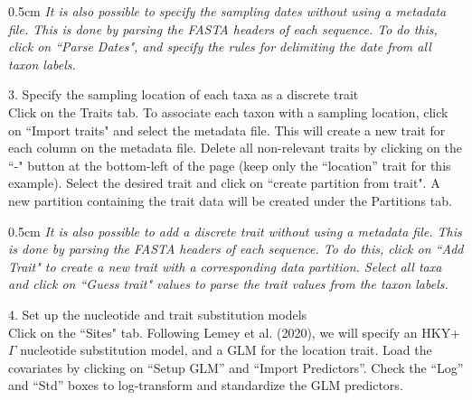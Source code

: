 \documentclass{article}
\newcommand{\ann}[1]{
\begin{adjustwidth}{0.5cm}{}
\it{#1}\\
\end{adjustwidth}}
\begin{document}
\ann{It is also possible to specify the sampling dates without using a metadata file. This is done by parsing the FASTA headers of each sequence. To do this, click on ``Parse Dates", and specify the rules for delimiting the date from all taxon labels.} %

3. Specify the sampling location of each taxa as a discrete trait\\

Click on the Traits tab.
To associate each taxon with a sampling location, click on ``Import traits" and select the metadata file. %
This will create a new trait for each column on the metadata file. Delete all non-relevant traits by clicking on the ``-" button at the bottom-left of the page (keep only the ``location'' trait for this example). Select the desired trait and click on ``create partition from trait". A new partition containing the trait data will be created under the Partitions tab.\\ %

\ann{It is also possible to add a discrete trait without using a metadata file. This is done by parsing the FASTA headers of each sequence. To do this, click on ``Add Trait" to create a new trait with a corresponding data partition. Select all taxa and click on ``Guess trait" values to parse the trait values from the taxon labels.}

4. Set up the nucleotide and trait substitution models\\

Click on the ``Sites" tab. Following Lemey et al. (2020), %
we will specify an HKY+$\Gamma$ nucleotide substitution model, and a GLM for the location trait.
Load the covariates by clicking on ``Setup GLM'' and ``Import Predictors''. %
Check the ``Log'' and ``Std'' boxes to log-transform and standardize the GLM predictors.\\
\end{document}
